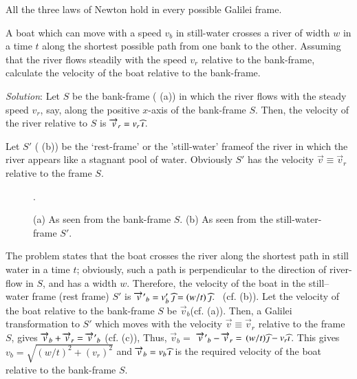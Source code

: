 \thm All the three laws of Newton hold in every 
possible Galilei frame.

\exm A boat which can move with a speed $v_b$ in 
still-water crosses a river of width $w$ in a time $t$ 
along the shortest possible path from one bank to the 
other. Assuming that the river flows steadily with the 
speed $v_r$ relative to the bank-frame, calculate the  
velocity of the boat relative to the bank-frame.

\textsl{Solution}: Let $S$ be the bank-frame  
( (a)) in which the river flows with the 
steady speed $v_r$, say, along the positive $x$-axis of 
the bank-frame $S$. Then, the velocity of the river 
relative to $S$ is $\overrightarrow{v}_r = v_r\,{\widehat{\imath}}$. 

Let $S'$  ( (b)) be the `rest-frame' or 
the 'still-water' frameof the river in which the river 
appears like a stagnant pool of water. Obviously $S'$ 
has the velocity $\vec{v} \equiv \vec{v}_r$ relative to 
the frame $S$. 

\begin{figure}[ht]
\centering
{}
\caption{(a) As seen from the bank-frame $S$. (b) As 
seen from the still-water-frame $S'$.}
\label{fig1.2}. 
\end{figure}

The problem states that the boat crosses the river 
along the shortest path in still water in a time $t$; 
obviously, such a path is perpendicular to the 
direction of river-flow in $S$, and has a width $w$. 
Therefore, the velocity of the boat  in the 
still--water frame (rest frame) $S'$ is   ${\overrightarrow{v}\hspace*{.3pt}'}_b= 
v'_b\,{\widehat{\jmath}} = (w/t)\,{\widehat{\jmath}}$. \  (cf.  
(b)). Let the velocity of the boat relative to the 
bank-frame $S$ be $\vec{v}_b$\lbk  (cf.  
(a)). Then, a Galilei transformation to $S'$ which 
moves with the velocity $\vec{v}\equiv\vec{v}_r$ 
relative to the frame $S$, gives $\overrightarrow{v}_b +\overrightarrow{v}_r= 
{\overrightarrow{v}\hspace*{.3pt}'}_b$ (cf.  (c)), Thus, $ 
\vec{v}_b = $ ${\overrightarrow{v}\hspace*{.3pt}'}_b-\overrightarrow{v}_r =$ $ (w/t){\widehat{\jmath}} 
-v_r{\widehat{\imath}}$.  This gives $v_b=\sqrt{(w/t)^2+(v_r)^2}$ and 
 $\overrightarrow{v}_b =v_b\, {\widehat{\imath}} $ is the required velocity of 
the boat relative to the bank-frame $S$.%

